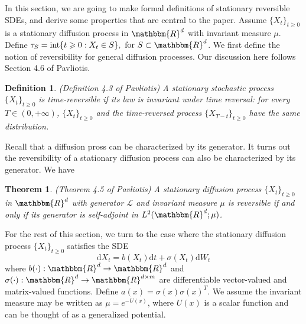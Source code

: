 \documentclass[english, aip, jcp, priprint, graphicx,floatfix]{revtex4-1}
\newtheorem{definition}{Definition}
\newtheorem{theorem}{Theorem}
\theoremstyle{plain}
\theoremstyle{definition}
\theoremstyle{plain}
\begin{document}
In this section, we are going to make formal definitions of stationary
reversible SDEs, and derive some properties that are central to the paper.
Assume $\{X_t\}_{t \geqslant 0}$ is a stationary diffusion process in
$\mathbbm{R}^d$ with invariant measure ${\mu}$. Define $\tau_S
=\ensuremath{\operatorname{int}} \{ t \geqslant 0 : X_t \in S \} , \text{ for
} S \subset \mathbbm{R}^d$. We first define the notion of reversibility for
general diffusion processes. Our discussion here follows Section 4.6 of
Pavliotis\cite{Pavliotis2016-xn}.

\begin{definition}
(Definition 4.3 of Pavliotis\cite{Pavliotis2016-xn}) A stationary stochastic
process $\{X_t\}_{t \geqslant 0}$ is time-reversible if its law is invariant under time
reversal: for every $T \in (0, + \infty)$, $\{X_t\}_{t \geqslant 0}$ and the time-reversed
process $\{X_{T - t}\}_{t \geqslant 0}$ have the same distribution.
\end{definition}

Recall that a diffusion pross can be characterized by its generator. It turns
out the reversibility of a stationary diffusion process can also be
characterized by its generator. We have

\begin{theorem}
\label{thm:reversibility}(Theorem 4.5 of Pavliotis\cite{Pavliotis2016-xn}) A
stationary diffusion process $\{X_t\}_{t \geqslant 0}$ in $\mathbbm{R}^d$ with generator
$\mathcal{L}$ and invariant measure ${\mu}$ is reversible if and only if
its generator is self-adjoint in $L^2 (\mathbbm{R}^d ; {\mu})$.
\end{theorem}

For the rest of this section, we turn to the case where the stationary
diffusion process $\{X_t\}_{t \geqslant 0}$ satisfies the SDE
\[ \mathrm{d} X_t = b (X_t) \mathrm{d} t + \sigma (X_t) \mathrm{d} W_t \]
where $b (\cdot) : \mathbbm{R}^d \rightarrow \mathbbm{R}^d$ and $\sigma
(\cdot) : \mathbbm{R}^d \rightarrow \mathbbm{R}^{d \times m}$ are
differentiable vector-valued and matrix-valued functions. Define $a (x) =
\sigma (x) \sigma (x)^T$. We assume the invariant measure may be written as
${\mu}= e^{- U (x)}$, where $U (x)$ is a scalar function and can be
thought of as a generalized potential.
\end{document}
